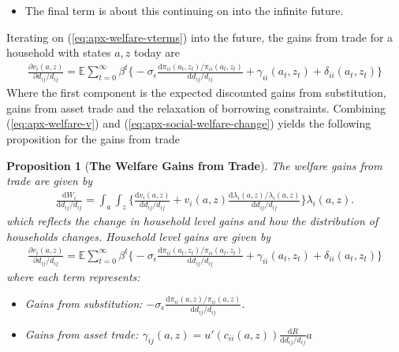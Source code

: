 \documentclass[12pt,pdftex]{article}
\newtheorem{prp}{Proposition}
\begin{document}
\begin{onehalfspacing}
\begin{itemize}
\item The final term is about this continuing on into the infinite future.
\end{itemize}
Iterating on (\ref{eq:apx-welfare-vterms}) into the future, the gains from trade for a household with states $a,z$ today are
\begin{align}
\frac{\partial v_i(a, z)}{\partial d_{ij} / d_{ij}} = \mathbb{E} \sum_{t = 0}^{\infty} \beta^{t} \bigg \{ -\sigma_{\epsilon} \frac{\mathrm{d} \pi_{ii}(a_{t},z_{t}) / \pi_{ii}(a_{t},z_{t})}{\mathrm{d}d_{ij} / d_{ij}} + \gamma_{ii}(a_{t},z_{t}) + \delta_{ii}(a_{t},z_{t}) \bigg \}
\label{eq:apx-welfare-v}
\end{align}
Where the first component is the expected discounted gains from substitution, gains from asset trade and the relaxation of borrowing constraints. Combining (\ref{eq:apx-welfare-v}) and (\ref{eq:apx-social-welfare-change}) yields the following proposition for the gains from trade

\begin{prp}[\textbf{The Welfare Gains from Trade}] \label{apx-prp:gains-trade} The welfare gains from trade are given by
{\footnotesize
\begin{align}
\frac{\mathrm{d} W_{i}}{\mathrm{d} d_{ij} / d_{ij}} = \int_{a}\int_{z}  \bigg \{ \frac{\mathrm{d} v_i(a, z)}{\mathrm{d} d_{ij} / d_{ij}}  + v_{i}(a,z) \frac{\mathrm{d} \lambda_{i}(a,z)/ \lambda_{i}(a,z)}{\mathrm{d} d_{ij} / d_{ij}}  \bigg \} \lambda_{i}(a,z).
\nonumber
\end{align}
}which reflects the change in household level gains and how the distribution of households changes. Household level gains are given by
{\footnotesize
\begin{align}
\nonumber
\frac{\partial v_i(a, z)}{\partial d_{ij} / d_{ij}} = \mathbb{E} \sum_{t = 0}^{\infty} \beta^{t} \bigg \{ -\sigma_{\epsilon} \frac{\mathrm{d} \pi_{ii}(a_{t},z_{t}) / \pi_{ii}(a_{t},z_{t})}{\mathrm{d}d_{ij} / d_{ij}} + \gamma_{ii}(a_{t},z_{t}) + \delta_{ii}(a_{t},z_{t}) \bigg \}
\end{align}
}where each term represents:
\begin{itemize}
\item Gains from substitution: $-\sigma_{\epsilon} \frac{\mathrm{d} \pi_{ii}(a,z) / \pi_{ii}(a,z)}{\mathrm{d}d_{ij} / d_{ij}}$.

\item Gains from asset trade: $\gamma_{ij}(a,z) = u'(c_{ii}(a,z))\frac{\mathrm{d} R}{\mathrm{d} d_{ij} / d_{ij}}a$


\end{itemize}
\end{prp}
\end{onehalfspacing}
\end{document}
